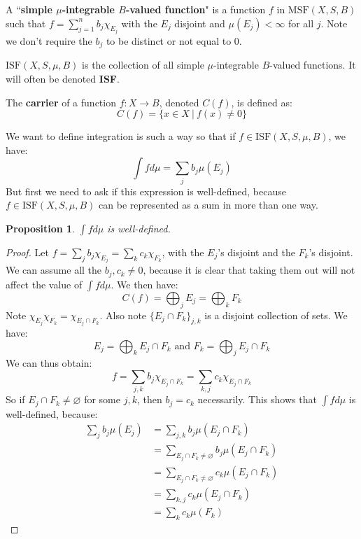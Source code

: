\documentclass[a4paper,12pt]{report}
\newtheorem{prop}[theorem]{Proposition}
\newenvironment{definition}[1][Definition.]{\begin{trivlist}
\item[\hskip \labelsep {\bfseries #1}]}{\end{trivlist}}
\begin{document}
	\begin{definition}
	A ``\textbf{simple $\mu$-integrable $B$-valued function}" is a function $f$ in $\text{MSF}(X, S, B)$ such that $f = \sum_{j=1}^n b_j \chi_{E_j}$ with the $E_j$ disjoint and $\mu(E_j) < \infty$ for all $j$. Note we don't require the $b_j$ to be distinct or not equal to 0. 
	\end{definition}
	
	\begin{definition}
	$\text{ISF}(X, S, \mu, B)$ is the collection of all simple $\mu$-integrable $B$-valued functions. It will often be denoted \textbf{ISF}.
	\end{definition}
	\begin{definition}
	The \textbf{carrier} of a function $f : X \rightarrow B$, denoted $C(f)$, is defined as:
	\[ C(f) = \{ x \in X ~|~ f(x) \neq 0 \} \]
	\end{definition}
	
	\noindent We want to define integration is such a way so that if $f \in \text{ISF}(X, S, \mu ,B)$, we have:
	\[ \int f d\mu = \sum_j b_j \mu(E_j) \]
	But first we need to ask if this expression is well-defined, because $f \in \text{ISF}(X, S, \mu, B)$ can be represented as a sum in more than one way. 
	
	\begin{prop}
	$\int f d\mu$ is well-defined. 
	\end{prop}
	\begin{proof}
	Let $f = \sum_j b_j\chi_{E_j} = \sum_k c_k \chi_{F_k}$, with the $E_j$'s disjoint and the $F_k$'s disjoint. We can assume all the $b_j, c_k \neq 0$, because it is clear that taking them out will not affect the value of $\int f d\mu$. We then have:
	\[ C(f) = \bigoplus_j E_j = \bigoplus_k F_k \]
	Note $\chi_{E_j} \chi_{F_k} = \chi_{E_j \cap F_k}$. Also note $\{E_j \cap F_k\}_{j,k}$ is a disjoint collection of sets. We have:
	\[ E_j = \bigoplus_k E_j \cap F_k \text{ and } F_k = \bigoplus_j E_j \cap F_k \]
	We can thus obtain:
	\[ f = \sum_{j, k} b_j \chi_{E_j \cap F_k} = \sum_{k, j} c_k \chi_{E_j \cap F_k} \]
	So if $E_j \cap F_k \neq \varnothing$ for some $j, k$, then $b_j = c_k$ necessarily. This shows that $\int f d\mu$ is well-defined, because:
	\begin{align*}
	\sum_j b_j \mu(E_j) &= \sum_{j, k} b_j \mu(E_j \cap F_k) \\
	&= \sum_{E_j \cap F_k \neq \varnothing} b_j \mu(E_j \cap F_k) \\
	&= \sum_{E_j \cap F_k \neq \varnothing} c_k \mu(E_j \cap F_k) \\
	&= \sum_{k, j} c_k \mu(E_j \cap F_k) \\ 
	&= \sum_k c_k \mu(F_k)
	\end{align*}
	\end{proof} 
	
\end{document}
